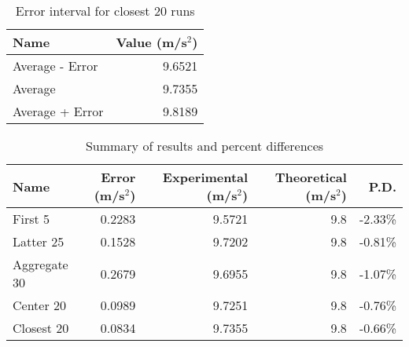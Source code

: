 \newpage
\begin{table}[ht]
    \centering
    \begin{tabular}{|l|r|}
        \hline
        Name & Value (m/s$^{2}$) \\
        \hline
        Average - Error & 9.6521 \\
        Average & 9.7355 \\
        Average + Error & 9.8189 \\
        \hline
    \end{tabular}
    \caption{Error interval for closest 20 runs}
    \label{table:01.error.20.close}
\end{table}
\begin{table}[ht]
    \centering
    \begin{tabular}{|l|r|r|r|r|}
        \hline
        Name & Error (m/s$^{2}$) & Experimental (m/s$^{2}$) & Theoretical (m/s$^{2}$) & P.D. \\
        \hline
        First 5 & 0.2283 & 9.5721 & 9.8 & -2.33\% \\
        Latter 25 & 0.1528 & 9.7202 & 9.8 & -0.81\% \\
        Aggregate 30 & 0.2679 & 9.6955 & 9.8 & -1.07\% \\
        Center 20 & 0.0989 & 9.7251 & 9.8 & -0.76\% \\
        Closest 20 & 0.0834 & 9.7355 & 9.8 & -0.66\% \\
        \hline
    \end{tabular}
    \caption{Summary of results and percent differences}
    \label{table:01.summary}
\end{table}

